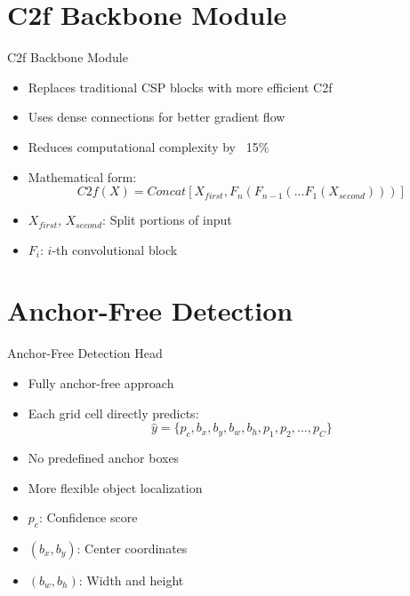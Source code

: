 \documentclass{beamer}
\begin{document}
\section{C2f Backbone Module}
\begin{frame}{C2f Backbone Module}
    \begin{itemize}
        \item Replaces traditional CSP blocks with more efficient C2f
        \item Uses dense connections for better gradient flow
        \item Reduces computational complexity by ~15\%
        \item Mathematical form:
            \begin{equation}
            C2f(X) = Concat[X_{first}, F_n(F_{n-1}(...F_1(X_{second})))]
            \end{equation}
        \item $X_{first}$, $X_{second}$: Split portions of input
        \item $F_i$: $i$-th convolutional block
    \end{itemize}
\end{frame}

\section{Anchor-Free Detection}
\begin{frame}{Anchor-Free Detection Head}
    \begin{itemize}
        \item Fully anchor-free approach
        \item Each grid cell directly predicts:
            \begin{equation}
            \hat{y} = \{p_c, b_x, b_y, b_w, b_h, p_1, p_2, ..., p_C\}
            \end{equation}
        \item No predefined anchor boxes
        \item More flexible object localization
        \item $p_c$: Confidence score
        \item $(b_x, b_y)$: Center coordinates
        \item $(b_w, b_h)$: Width and height
    \end{itemize}
\end{frame}
\end{document}
